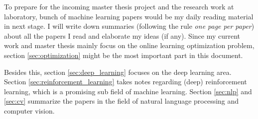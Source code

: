 To prepare for the incoming master thesis project and the research work at laboratory, bunch of machine learning papers would be my daily reading material in next stage. 
I will write down summaries (following the rule \textit{one page per paper}) about all the papers I read and elaborate my ideas (if any). 
Since my current work and master thesis mainly focus on the online learning optimization problem, section \ref{sec:optimization} might be the most important part in this document. 

Besides this, section \ref{sec:deep_learning} focuses on the deep learning area. Section \ref{sec:reinforcement_learning} takes notes regarding (deep) reinforcement learning, which is a promising sub field of machine learning. Section \ref{sec:nlp} and \ref{sec:cv} summarize the papers in the field of natural language processing and computer vision. 

